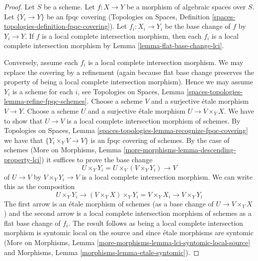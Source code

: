 \documentclass[10pt,a4paper]{amsart}
\theoremstyle{plain}
\theoremstyle{definition}
\theoremstyle{remark}
\numberwithin{equation}{subsection}
\begin{document}
\begin{proof}
Let $S$ be a scheme. Let $f : X \to Y$ be a
morphism of algebraic spaces over $S$.
Let $\{Y_i \to Y\}$ be an fpqc covering
(Topologies on Spaces, Definition
\ref{spaces-topologies-definition-fpqc-covering}).
Let $f_i : X_i \to Y_i$ be the base change of $f$ by $Y_i \to Y$.
If $f$ is a local complete intersection morphism,
then each $f_i$ is a local complete intersection morphism
by Lemma \ref{lemma-flat-base-change-lci}.

\medskip\noindent
Conversely, assume each $f_i$ is a local complete intersection morphism.
We may replace the covering by a refinement (again because
flat base change preserves the property of being a
local complete intersection morphism). Hence we may assume
$Y_i$ is a scheme for each $i$, see
Topologies on Spaces, Lemma \ref{spaces-topologies-lemma-refine-fpqc-schemes}.
Choose a scheme $V$ and a surjective \'etale morphism $V \to Y$.
Choose a scheme $U$ and a surjective \'etale morphism
$U \to V \times_Y X$. We have to show that $U \to V$ is a
local complete intersection morphism of schemes.
By Topologies on Spaces, Lemma
\ref{spaces-topologies-lemma-recognize-fpqc-covering}
we have that $\{Y_i \times_Y V \to V\}$ is an fpqc covering
of schemes. By the case of schemes
(More on Morphisms, Lemma \ref{more-morphisms-lemma-descending-property-lci})
it suffices to prove the base change
$$
U \times_Y Y_i = U \times_V (V \times_Y Y_i) \longrightarrow V
$$
of $U \to V$ by $V \times_Y Y_i \to V$ is a
local complete intersection morphism. We can write this as the
composition
$$
U \times_Y Y_i \longrightarrow
(V \times_Y X) \times_Y Y_i = V \times_Y X_i \longrightarrow
V \times_Y Y_i
$$
The first arrow is an \'etale morphism of schemes (as a base change of
$U \to V \times_Y X$) and the second arrow is a
local complete intersection morphism of schemes as a flat base change of $f_i$.
The result follows as being a local complete intersection morphism
is syntomic local on the source and since \'etale morphisms
are syntomic (More on Morphisms, Lemma
\ref{more-morphisms-lemma-lci-syntomic-local-source}
and Morphisms, Lemma \ref{morphisms-lemma-etale-syntomic}).
\end{proof}
\end{document}
